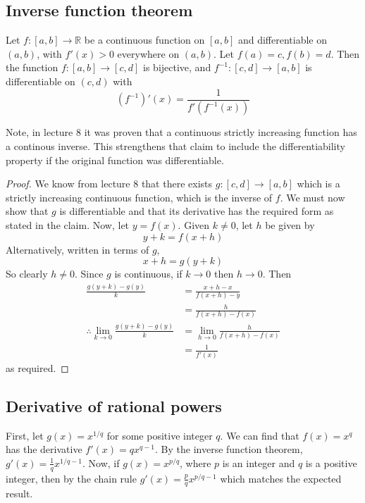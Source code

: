 \subsection{Inverse function theorem}
\begin{theorem}
	Let \(f \colon [a, b] \to \mathbb R\) be a continuous function on \([a, b]\) and differentiable on \((a, b)\), with \(f'(x) > 0\) everywhere on \((a, b)\).
	Let \(f(a) = c, f(b) = d\).
	Then the function \(f \colon [a,b] \to [c,d]\) is bijective, and \(f^{-1} \colon [c,d] \to [a,b]\) is differentiable on \((c, d)\) with
	\[
		\left( f^{-1} \right)' (x) = \frac{1}{f'\left(f^{-1}(x)\right)}
	\]
\end{theorem}
\noindent Note, in lecture 8 it was proven that a continuous strictly increasing function has a continous inverse.
This strengthens that claim to include the differentiability property if the original function was differentiable.
\begin{proof}
	We know from lecture 8 that there exists \(g \colon [c,d] \to [a,b]\) which is a strictly increasing continuous function, which is the inverse of \(f\).
	We must now show that \(g\) is differentiable and that its derivative has the required form as stated in the claim.
	Now, let \(y = f(x)\).
	Given \(k \neq 0\), let \(h\) be given by
	\[
		y + k = f(x+h)
	\]
	Alternatively, written in terms of \(g\),
	\[
		x + h = g(y + k)
	\]
	So clearly \(h \neq 0\).
	Since \(g\) is continuous, if \(k \to 0\) then \(h \to 0\).
	Then
	\begin{align*}
		\frac{g(y + k) - g(y)}{k}                           & = \frac{x + h - x}{f(x+h) - y}           \\
		                                                    & = \frac{h}{f(x+h) - f(x)}                \\
		\therefore \lim_{k \to 0} \frac{g(y + k) - g(y)}{k} & = \lim_{h \to 0} \frac{h}{f(x+h) - f(x)} \\
		                                                    & = \frac{1}{f'(x)}
	\end{align*}
	as required.
\end{proof}

\subsection{Derivative of rational powers}
First, let \(g(x) = x^{1/q}\) for some positive integer \(q\).
We can find that \(f(x) = x^q\) has the derivative \(f'(x) = qx^{q-1}\).
By the inverse function theorem, \(g'(x) = \frac{1}{q}x^{1/q - 1}\).
Now, if \(g(x) = x^{p/q}\), where \(p\) is an integer and \(q\) is a positive integer, then by the chain rule \(g'(x) = \frac{p}{q}x^{p/q - 1}\) which matches the expected result.

